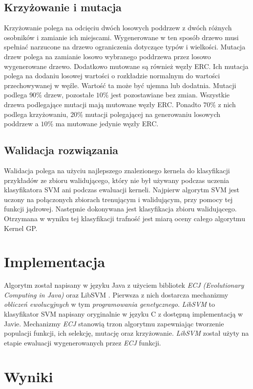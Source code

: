 \documentclass{article}
\begin{document}
\subsection{Krzyżowanie i mutacja}
Krzyżowanie polega na odcięciu dwóch losowych poddrzew z dwóch różnych osobników i zamianie ich miejscami. Wygenerowane w ten sposób drzewo musi spełniać narzucone na drzewo ograniczenia dotyczące typów i wielkości.
Mutacja drzew polega na zamianie losowo wybranego poddrzewa przez losowo wygenerowane drzewo.
Dodatkowo mutowane są również węzły ERC. Ich mutacja polega na dodaniu losowej wartości o rozkładzie normalnym do wartości przechowywanej w węźle. Wartość ta może być ujemna lub dodatnia.
Mutacji podlega $ 90\% $ drzew, pozostałe $ 10\% $ jest pozostawiane bez zmian. Wszystkie drzewa podlegające mutacji mają mutowane węzły ERC. Ponadto $ 70\% $ z nich podlega krzyżowaniu, $ 20\% $ mutacji polegającej na generowaniu losowych poddrzew a $ 10\% $ ma mutowane jedynie węzły ERC.

\subsection{Walidacja rozwiązania}
Walidacja polega na użyciu najlepszego znalezionego kernela do klasyfikacji przykładów ze zbioru walidującego, który nie był używany podczas uczenia klasyfikatora SVM ani podczas ewaluacji kerneli.
Najpierw algorytm SVM jest uczony na połączonych zbiorach trenującym i walidującym, przy pomocy tej funkcji jądrowej. Następnie dokonywana jest klasyfikacja zbioru walidującego. Otrzymana w wyniku tej klasyfikacji trafność jest miarą oceny całego algorytmu Kernel GP.

\section{Implementacja}
Algorytm został napisany w języku Java z użyciem bibliotek \textit{ECJ (Evolutionary Computing in Java)} \cite{sean_ecj_2010} oraz LibSVM \cite{chang_libsvm:_2011}. Pierwsza z nich dostarcza mechanizmy \textit{obliczeń ewolucyjnych} w tym \textit{programowania genetycznego}.
\emph{LibSVM} to klasyfikator SVM napisany oryginalnie w języku C z dostępną implementacją w Javie.
Mechanizmy \emph{ECJ} stanowią trzon algorytmu zapewniając tworzenie populacji funkcji, ich selekcję, mutację oraz krzyżowanie. \emph{LibSVM} został użyty na etapie ewaluacji wygenerowanych przez \emph{ECJ} funkcji.
	

\section{Wyniki}
\end{document}
